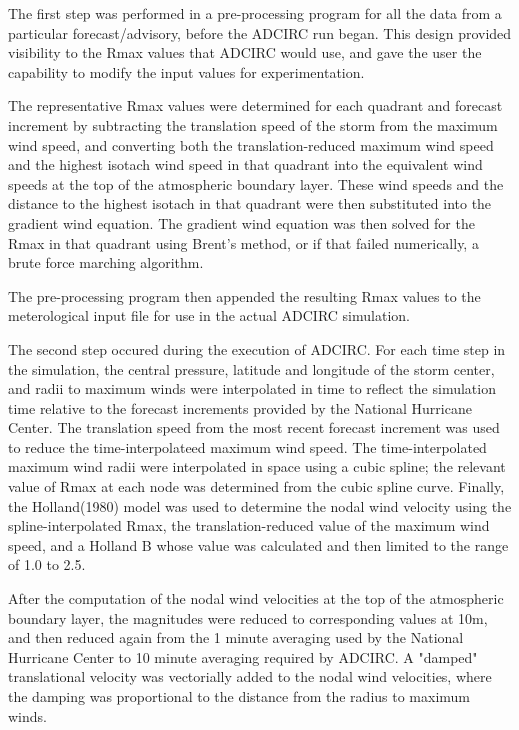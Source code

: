 \documentclass[12pt]{article}
\begin{document}
The first step was performed in a pre-processing program for all the 
data from a particular forecast/advisory, before the ADCIRC run 
began. This design provided visibility to the Rmax values that 
ADCIRC would use, and gave the user the capability to modify the 
input values for experimentation.

The representative Rmax values were determined for each quadrant and 
forecast increment by subtracting the translation speed of the storm 
from the maximum wind speed, and converting both the 
translation-reduced maximum wind speed and the highest isotach wind 
speed in that quadrant into the equivalent wind speeds at the top of 
the atmospheric boundary layer. These wind speeds and the distance 
to the highest isotach in that quadrant were then substituted into 
the gradient wind equation. The gradient wind equation was then 
solved for the Rmax in that quadrant using Brent's method, or if 
that failed numerically, a brute force marching algorithm.

The pre-processing program then appended the resulting Rmax values 
to the meterological input file for use in the actual ADCIRC 
simulation.

The second step occured during the execution of ADCIRC. For each 
time step in the simulation, the central pressure, latitude and 
longitude of the storm center, and radii to maximum winds were 
interpolated in time to reflect the simulation time relative to the 
forecast increments provided by the National Hurricane Center. The 
translation speed from the most recent forecast increment was used 
to reduce the time-interpolateed maximum wind speed. The 
time-interpolated maximum wind radii were interpolated in space 
using a cubic spline; the relevant value of Rmax at each node was 
determined from the cubic spline curve. Finally, the Holland(1980) 
model was used to determine the nodal wind velocity using the 
spline-interpolated Rmax, the translation-reduced value of the 
maximum wind speed, and a Holland B whose value was calculated and 
then limited to the range of 1.0 to 2.5.

After the computation of the nodal wind velocities at the top of the 
atmospheric boundary layer, the magnitudes were reduced to 
corresponding values at 10m, and then reduced again from the 1 
minute averaging used by the National Hurricane Center to 10 minute 
averaging required by ADCIRC. A "damped" translational velocity was 
vectorially added to the nodal wind velocities, where the damping 
was proportional to the distance from the radius to maximum winds.
\end{document}
